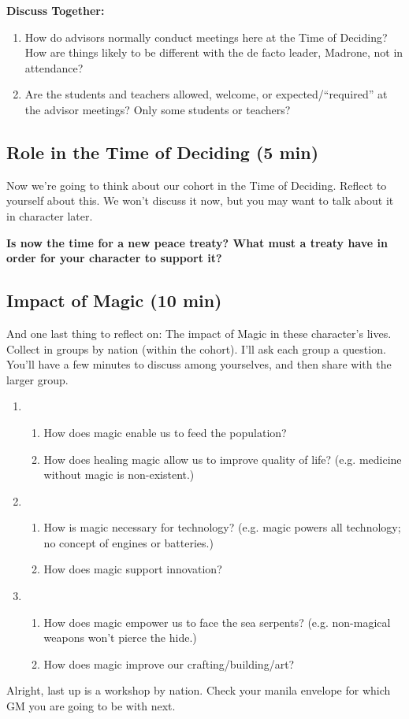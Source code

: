 \documentclass[green]{GL2020}
\begin{document}
\textbf{Discuss Together:}
\begin{enumerate}
	\item How do advisors normally conduct meetings here at the Time of Deciding? How are things likely to be different with the de facto leader, Madrone, not in attendance?  
	\item Are the students and teachers allowed, welcome, or expected/``required'' at the advisor meetings? Only some students or teachers?
\end{enumerate}

\subsection*{Role in the Time of Deciding (5 min)}
Now we’re going to think about our cohort in the Time of Deciding. Reflect to yourself about this. We won't discuss it now, but you may want to talk about it in character later.

\textbf{Is now the time for a new peace treaty? What must a treaty have in order for your character to support it?}

\subsection*{Impact of Magic (10 min)}
And one last thing to reflect on: The impact of Magic in these character’s lives. Collect in groups by nation (within the cohort). I’ll ask each group a question. You’ll have a few minutes to discuss among yourselves, and then share with the larger group.
\begin{enumerate}
	\item \pFarm{}
	\begin{enumerate}
		\item How does magic enable us to feed the population?
		\item How does healing magic allow us to improve quality of life? (e.g. medicine without magic is non-existent.)
	\end{enumerate}
	\item \pTech{}
	\begin{enumerate}
		\item How is magic necessary for technology? (e.g. magic powers all technology; no concept of engines or batteries.)
		\item How does magic support innovation?
	\end{enumerate}
	\item \pShip{}
	\begin{enumerate}
		\item How does magic empower us to face the sea serpents? (e.g. non-magical weapons won’t pierce the hide.)
		\item How does magic improve our crafting/building/art?
	\end{enumerate}
\end{enumerate}

Alright, last up is a workshop by nation. Check your manila envelope for which GM you are going to be with next.
\end{document}
